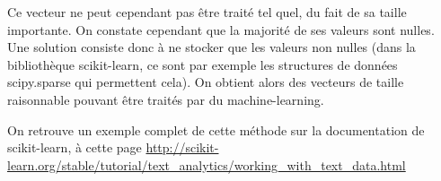 Ce vecteur ne peut cependant pas être traité tel quel, du fait de sa taille importante. On constate cependant que la majorité de ses valeurs sont nulles. Une solution consiste donc à ne stocker que les valeurs non nulles (dans la bibliothèque scikit-learn, ce sont par exemple les structures de données scipy.sparse qui permettent cela). On obtient alors des vecteurs de taille raisonnable pouvant être traités par du machine-learning.

On retrouve un exemple complet de cette méthode sur la documentation de scikit-learn, à cette page \url{http://scikit-learn.org/stable/tutorial/text_analytics/working_with_text_data.html}
